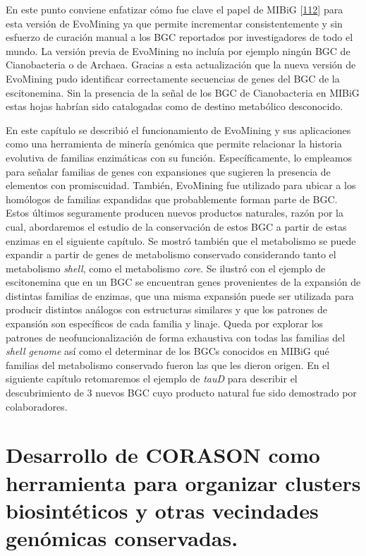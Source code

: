 \documentclass[12pt,twoside]{reedthesis}
\begin{document}
  En este punto conviene enfatizar cómo fue clave el papel de MIBiG
  {[}\protect\hyperlink{ref-medema_minimum_2015}{112}{]} para esta versión
  de EvoMining ya que permite incrementar consistentemente y sin esfuerzo
  de curación manual a los BGC reportados por investigadores de todo el
  mundo. La versión previa de EvoMining no incluía por ejemplo ningún BGC
  de Cianobacteria o de Archaea. Gracias a esta actualización que la nueva
  versión de EvoMining pudo identificar correctamente secuencias de genes
  del BGC de la escitonemina. Sin la presencia de la señal de los BGC de
  Cianobacteria en MIBiG estas hojas habrían sido catalogadas como de
  destino metabólico desconocido.
  
  En este capítulo se describió el funcionamiento de EvoMining y sus
  aplicaciones como una herramienta de minería genómica que permite
  relacionar la historia evolutiva de familias enzimáticas con su función.
  Específicamente, lo empleamos para señalar familias de genes con
  expansiones que sugieren la presencia de elementos con promiscuidad.
  También, EvoMining fue utilizado para ubicar a los homólogos de familias
  expandidas que probablemente forman parte de BGC. Estos últimos
  seguramente producen nuevos productos naturales, razón por la cual,
  abordaremos el estudio de la conservación de estos BGC a partir de estas
  enzimas en el siguiente capítulo. Se mostró también que el metabolismo
  se puede expandir a partir de genes de metabolismo conservado
  considerando tanto el metabolismo \emph{shell}, como el metabolismo
  \emph{core}. Se ilustró con el ejemplo de escitonemina que en un BGC se
  encuentran genes provenientes de la expansión de distintas familias de
  enzimas, que una misma expansión puede ser utilizada para producir
  distintos análogos con estructuras similares y que los patrones de
  expansión son específicos de cada familia y linaje. Queda por explorar
  los patrones de neofuncionalización de forma exhaustiva con todas las
  familias del \emph{shell genome} así como el determinar de los BGCs
  conocidos en MIBiG qué familias del metabolismo conservado fueron las
  que les dieron origen. En el siguiente capítulo retomaremos el ejemplo
  de \emph{tauD} para describir el descubrimiento de 3 nuevos BGC cuyo
  producto natural fue sido demostrado por colaboradores.
  
  \chapter{Desarrollo de CORASON como herramienta para organizar clusters
  biosintéticos y otras vecindades genómicas
  conservadas.}\label{desarrollo-de-corason-como-herramienta-para-organizar-clusters-biosinteticos-y-otras-vecindades-genomicas-conservadas.}
  
\end{document}
